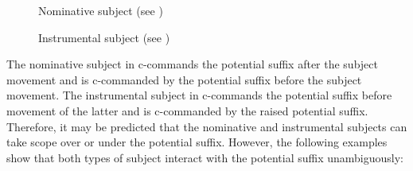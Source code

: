 \documentclass[output=paper]{langscibook}
\begin{document}
\begin{figure}
\begin{floatrow}
\captionsetup{margin=.05\linewidth}
        {\caption{\label{takaha19a}Nominative subject (see )}}
        {\caption{\label{takaha19b}Instrumental subject (see )}}
\end{floatrow}
\end{figure}

The nominative subject in  c-commands the potential suffix after the subject movement and is c-commanded by the potential suffix before the subject movement. The instrumental subject in  c-commands the potential suffix before movement of the latter and is c-commanded by the raised potential suffix. Therefore, it may be predicted that the nominative and instrumental subjects can take scope over or under the potential suffix. However, the following examples show that both types of subject interact with the potential suffix unambiguously:
\end{document}
